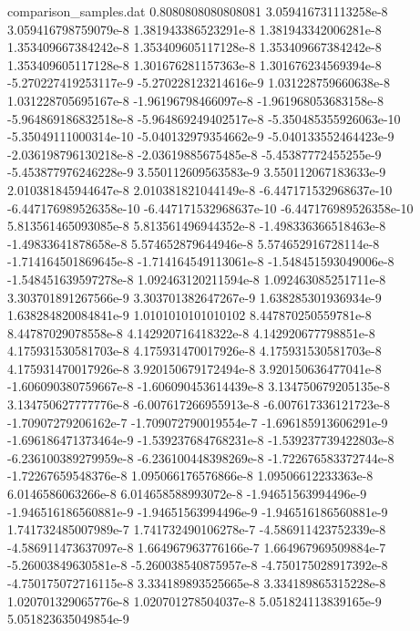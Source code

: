 \begin{filecontents}{comparison_samples.dat}
0.8080808080808081  3.059416731113258e-8    3.059416798759079e-8    1.381943386523291e-8   1.381943342006281e-8   1.353409667384242e-8   1.353409605117128e-8   1.353409667384242e-8   1.353409605117128e-8   1.301676281157363e-8   1.301676234569394e-8   -5.270227419253117e-9   -5.270228123214616e-9   1.031228759660638e-8   1.031228705695167e-8   -1.96196798466097e-8    -1.961968053683158e-8   -5.964869186832518e-8   -5.964869249402517e-8   -5.350485355926063e-10  -5.35049111000314e-10   -5.040132979354662e-9   -5.040133552464423e-9   -2.036198796130218e-8   -2.03619885675485e-8    -5.45387772455255e-9    -5.453877976246228e-9   3.550112609563583e-9   3.550112067183633e-9   2.010381845944647e-8   2.010381821044149e-8   -6.447171532968637e-10  -6.447176989526358e-10  -6.447171532968637e-10  -6.447176989526358e-10  5.813561465093085e-8   5.813561496944352e-8   -1.498336366518463e-8   -1.49833641878658e-8    5.574652879644946e-8   5.574652916728114e-8   -1.714164501869645e-8   -1.714164549113061e-8   -1.548451593049006e-8   -1.548451639597278e-8   1.092463120211594e-8   1.092463085251711e-8   3.303701891267566e-9   3.303701382647267e-9   1.638285301936934e-9    1.638284820084841e-9  
1.0101010101010102  8.447870250559781e-8    8.44787029078558e-8     4.142920716418322e-8   4.142920677798851e-8   4.175931530581703e-8   4.175931470017926e-8   4.175931530581703e-8   4.175931470017926e-8   3.920150679172494e-8   3.920150636477041e-8   -1.606090380759667e-8   -1.606090453614439e-8   3.134750679205135e-8   3.134750627777776e-8   -6.007617266955913e-8   -6.007617336121723e-8   -1.70907279206162e-7    -1.709072790019554e-7   -1.696185913606291e-9   -1.696186471373464e-9   -1.539237684768231e-8   -1.539237739422803e-8   -6.236100389279959e-8   -6.236100448398269e-8   -1.722676583372744e-8   -1.72267659548376e-8    1.095066176576866e-8   1.09506612233363e-8    6.0146586063266e-8     6.014658588993072e-8   -1.94651563994496e-9    -1.946516186560881e-9   -1.94651563994496e-9    -1.946516186560881e-9   1.741732485007989e-7   1.741732490106278e-7   -4.586911423752339e-8   -4.586911473637097e-8   1.664967963776166e-7   1.664967969509884e-7   -5.26003849630581e-8    -5.260038540875957e-8   -4.750175028917392e-8   -4.750175072716115e-8   3.334189893525665e-8   3.334189865315228e-8   1.020701329065776e-8   1.020701278504037e-8   5.051824113839165e-9    5.051823635049854e-9  

\end{filecontents}
